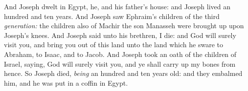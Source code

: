 \documentclass[11pt,letterpaper,oneside]{memoir}
\begin{document}
And Joseph dwelt in Egypt, he, and his father's house: and Joseph lived
an hundred and ten years. And Joseph saw Ephraim's children of the third
\emph{generation:} the children also of Machir the son Manasseh were
brought up upon Joseph's knees. And Joseph said unto his brethren, I
die: and God will surely visit you, and bring you out of this land unto
the land which he sware to Abraham, to Isaac, and to Jacob. And Joseph
took an oath of the children of Israel, saying, God will surely visit
you, and ye shall carry up my bones from hence. So Joseph died,
\emph{being} an hundred and ten years old: and they embalmed him, and he
was put in a coffin in Egypt.
\end{document}

